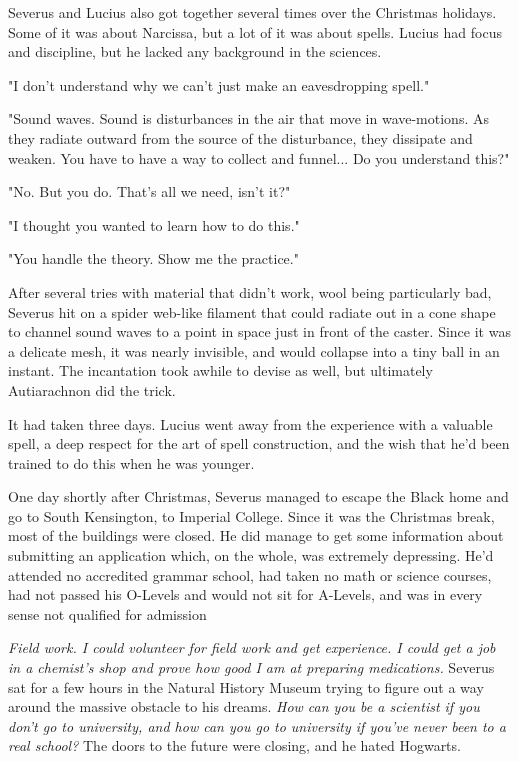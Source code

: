 Severus and Lucius also got together several times over the Christmas holidays. Some of it was about Narcissa, but a lot of it was about spells. Lucius had focus and discipline, but he lacked any background in the sciences.

"I don't understand why we can't just make an eavesdropping spell."

"Sound waves. Sound is disturbances in the air that move in wave-motions. As they radiate outward from the source of the disturbance, they dissipate and weaken. You have to have a way to collect and funnel... Do you understand this?"

"No. But you do. That's all we need, isn't it?"

"I thought you wanted to learn how to do this."

"You handle the theory. Show me the practice."

After several tries with material that didn't work, wool being particularly bad, Severus hit on a spider web-like filament that could radiate out in a cone shape to channel sound waves to a point in space just in front of the caster. Since it was a delicate mesh, it was nearly invisible, and would collapse into a tiny ball in an instant. The incantation took awhile to devise as well, but ultimately Autiarachnon did the trick.

It had taken three days. Lucius went away from the experience with a valuable spell, a deep respect for the art of spell construction, and the wish that he'd been trained to do this when he was younger.

One day shortly after Christmas, Severus managed to escape the Black home and go to South Kensington, to Imperial College. Since it was the Christmas break, most of the buildings were closed. He did manage to get some information about submitting an application which, on the whole, was extremely depressing. He'd attended no accredited grammar school, had taken no math or science courses, had not passed his O-Levels and would not sit for A-Levels, and was in every sense not qualified for admission

\emph{Field work. I could volunteer for field work and get experience. I could get a job in a chemist's shop and prove how good I am at preparing medications.} Severus sat for a few hours in the Natural History Museum trying to figure out a way around the massive obstacle to his dreams. \emph{How can you be a scientist if you don't go to university, and how can you go to university if you've never been to a real school?} The doors to the future were closing, and he hated Hogwarts.

